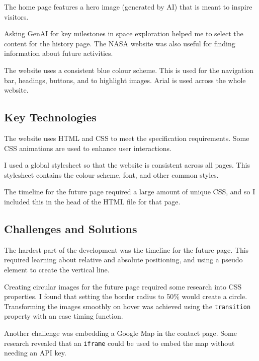\documentclass{article}
\begin{document}
The home page features a hero image (generated by AI) that is meant to inspire visitors.

Asking GenAI for key milestones in space exploration helped me to select the content for the history page. The NASA website was also useful for finding information about future activities.

The website uses a consistent blue colour scheme. This is used for the navigation bar, headings, buttons, and to highlight images. Arial is used across the whole website.

\subsection{Key Technologies}
The website uses HTML and CSS to meet the specification requirements. Some CSS animations are used to enhance user interactions.

I used a global stylesheet so that the website is consistent across all pages. This stylesheet contains the colour scheme, font, and other common styles.

The timeline for the future page required a large amount of unique CSS, and so I included this in the head of the HTML file for that page.

\subsection{Challenges and Solutions}
The hardest part of the development was the timeline for the future page. This required learning about relative and absolute positioning, and using a pseudo element to create the vertical line.

Creating circular images for the future page required some research into CSS properties. I found that setting the border radius to 50\% would create a circle. Transforming the images smoothly on hover was achieved using the \texttt{transition} property with an ease timing function.

Another challenge was embedding a Google Map in the contact page. Some research revealed that an \texttt{iframe} could be used to embed the map without needing an API key.
\end{document}

